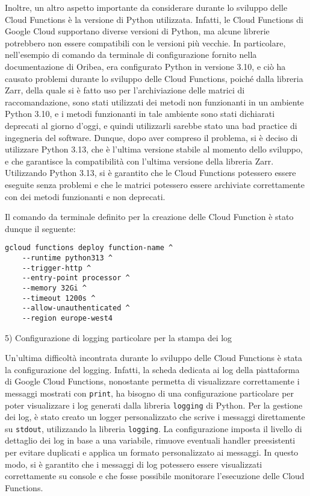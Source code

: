 Inoltre, un altro aspetto importante da considerare durante lo sviluppo delle Cloud Functions è la versione di Python utilizzata. Infatti, le Cloud Functions di Google Cloud supportano diverse versioni di Python, ma alcune librerie potrebbero non essere compatibili con le versioni più vecchie. In particolare, nell'esempio di comando da terminale di configurazione fornito nella documentazione di Oribea, era configurato Python in versione 3.10, e ciò ha causato problemi durante lo sviluppo delle Cloud Functions, poiché dalla libreria Zarr, della quale si è fatto uso per l'archiviazione delle matrici di raccomandazione, sono stati utilizzati dei metodi non funzionanti in un ambiente Python 3.10, e i metodi funzionanti in tale ambiente sono stati dichiarati deprecati al giorno d'oggi, e quindi utilizzarli sarebbe stato una bad practice di ingegneria del software. Dunque, dopo aver compreso il problema, si è deciso di utilizzare Python 3.13, che è l'ultima versione stabile al momento dello sviluppo, e che garantisce la compatibilità con l'ultima versione della libreria Zarr. Utilizzando Python 3.13, si è garantito che le Cloud Functions potessero essere eseguite senza problemi e che le matrici potessero essere archiviate correttamente con dei metodi funzionanti e non deprecati.

Il comando da terminale definito per la creazione delle Cloud Function è stato dunque il seguente:
\begin{verbatim}
gcloud functions deploy function-name ^
    --runtime python313 ^
    --trigger-http ^
    --entry-point processor ^
    --memory 32Gi ^
    --timeout 1200s ^
    --allow-unauthenticated ^
    --region europe-west4
\end{verbatim}

5) Configurazione di logging particolare per la stampa dei log

Un'ultima difficoltà incontrata durante lo sviluppo delle Cloud Functions è stata la configurazione del logging. Infatti, la scheda dedicata ai log della piattaforma di Google Cloud Functions, nonostante permetta di visualizzare correttamente i messaggi mostrati con \texttt{print}, ha bisogno di una configurazione particolare per poter visualizzare i log generati dalla libreria \texttt{logging} di Python. Per la gestione dei log, è stato creato un logger personalizzato che scrive i messaggi direttamente su \texttt{stdout}, utilizzando la libreria \texttt{logging}. La configurazione imposta il livello di dettaglio dei log in base a una variabile, rimuove eventuali handler preesistenti per evitare duplicati e applica un formato personalizzato ai messaggi. In questo modo, si è garantito che i messaggi di log potessero essere visualizzati correttamente  su console e che fosse possibile monitorare l'esecuzione delle Cloud Functions.

